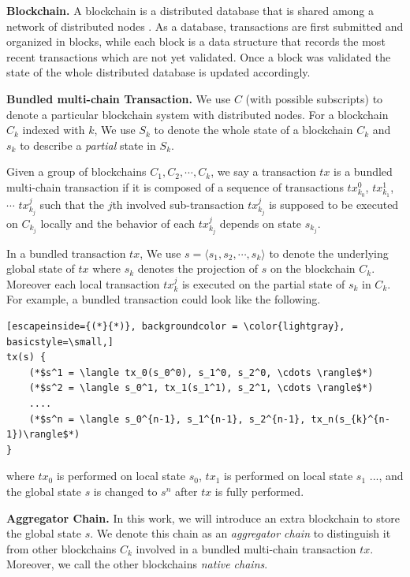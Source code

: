 \documentclass[pageno]{jpaper}
\begin{document}
\smallskip\noindent\textbf{Blockchain.}
A blockchain is a distributed database that is shared among a network of distributed nodes \cite{chen2018survey}. As a database, transactions are first submitted and organized in blocks, while each block is a data structure that records the most recent transactions which are not yet validated. Once a block was validated the state of the whole distributed database is updated accordingly.

\smallskip\noindent\textbf{Bundled multi-chain Transaction.}
We use $C$ (with possible subscripts) to denote a particular blockchain system with distributed nodes. For a blockchain $C_k$ indexed with $k$, We use $S_k$ to denote the whole state of a blockchain $C_{k}$ and $s_k$ to describe a \emph{partial} state in $S_k$.

Given a group of blockchains $C_{1}, C_{2}, \cdots, C_{k}$, we say a transaction $tx$ is a bundled multi-chain transaction if it is composed of a sequence of transactions $tx_{k_0}^0$, $tx_{k_1}^1$, $\cdots$ $tx_{k_j}^j$ such that the $j$th involved sub-transaction $tx_{k_j}^j$ is supposed to be executed on $C_{k_j}$ locally and the behavior of each $tx_{k_j}^{j}$ depends on state $s_{k_j}$. 

In a bundled transaction $tx$, We use $s= \langle s_1, s_2, \cdots, s_k \rangle$ to denote the underlying global state of $tx$ where $s_k$ denotes the projection of $s$ on the blockchain $C_k$. Moreover each local transaction $tx_k^j$ is executed on the partial state of $s_k$ in $C_k$. For example, a bundled transaction could look like the following. 
\begin{lstlisting}[escapeinside={(*}{*)}, backgroundcolor = \color{lightgray}, basicstyle=\small,]
tx(s) {
    (*$s^1 = \langle tx_0(s_0^0), s_1^0, s_2^0, \cdots \rangle$*)
    (*$s^2 = \langle s_0^1, tx_1(s_1^1), s_2^1, \cdots \rangle$*)
    ....
    (*$s^n = \langle s_0^{n-1}, s_1^{n-1}, s_2^{n-1}, tx_n(s_{k}^{n-1})\rangle$*)
}
\end{lstlisting}
where $tx_0$ is performed on local state $s_0$, $tx_1$ is performed on local state $s_1$ ..., and the global state $s$ is changed to $s^n$ after $tx$ is fully performed.

\smallskip\noindent\textbf{Aggregator Chain.}
In this work, we will introduce an extra blockchain to store the global state $s$. We denote this chain as an \emph{aggregator chain} to distinguish it from other blockchains $C_{k}$ involved in a bundled multi-chain transaction $tx$. Moreover, we call the other blockchains \emph{native chains}.
\end{document}
